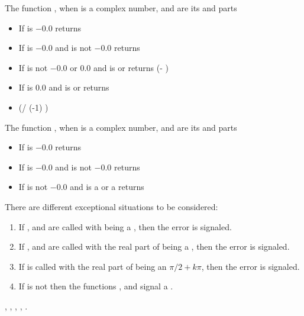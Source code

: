 \documentclass[../Exponentials-Logarithms-Trigonometry.tex]{subfiles}
\begin{document}
\noindent
The function , when  is a complex number, 
and  are its  and  parts
\begin{itemize}
\item If  is $-0.0$ returns 
\item If  is $-0.0$ and  is not
  $-0.0$ returns \code{)))}
\item If  is not $-0.0$ or $0.0$ and
   is  or  returns
   \code{)} (- )\code{))}
\item If  is $0.0$ and  is
   or  returns
\item {}(/ (-1) )\code{)}
\end{itemize}

\noindent
The function , when  is a complex number, 
and  are its  and  parts
\begin{itemize}
\item If  is $-0.0$ returns 
\item If  is $-0.0$ and  is not
  $-0.0$ returns \code{))))}
\item If  is not $-0.0$ and  is a
   or a  returns \code{))}
\end{itemize}

\DExceptional{}

There are different exceptional situations to be considered:
\begin{enumerate}
\item If ,  and  are called with
   being a , then the
   error is signaled.
\item If ,  and  are called with the real
  part of  being a , then the
   error is signaled.
\item If  is called with the real part of
   being an $\pi/2 + k\pi$, then the
   error is signaled.
\item If  is not \CL{}
   then the functions ,  and
   signal a .
\end{enumerate}

\DSeeAlso{}

\code{*}, \code{-}, , , .
\end{document}
